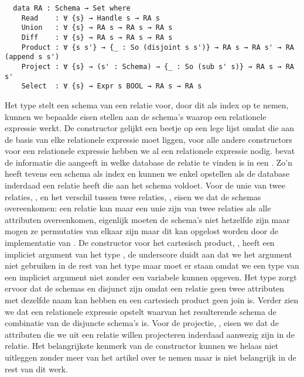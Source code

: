 \begin{verbatim}
  data RA : Schema → Set where
    Read    : ∀ {s} → Handle s → RA s
    Union   : ∀ {s} → RA s → RA s → RA s
    Diff    : ∀ {s} → RA s → RA s → RA s
    Product : ∀ {s s'} → {_ : So (disjoint s s')} → RA s → RA s' → RA (append s s')
    Project : ∀ {s} → (s' : Schema) → {_ : So (sub s' s)} → RA s → RA s'
    Select  : ∀ {s} → Expr s BOOL → RA s → RA s
\end{verbatim}

Het type  stelt een schema van een relatie voor, door dit als
index op te nemen, kunnen we bepaalde eisen stellen aan de schema's waarop een
relationele expressie werkt. De  constructor gelijkt een beetje op
een lege lijst omdat die aan de basis van elke relationele expressie moet
liggen, voor alle andere constructors voor een relationele expressie hebben we
al een relationele expressie nodig.  bevat de informatie die
aangeeft in welke database de relatie te vinden is in een . Zo'n
 heeft tevens een schema als index en kunnen we enkel opstellen
als de database inderdaad een relatie heeft die aan het schema voldoet. Voor de
unie van twee relaties, , en het verschil tussen twee relaties,
, eisen we dat de schemas overeenkomen: een relatie kan maar een
unie zijn van twee relaties als alle attributen overeenkomen, eigenlijk moeten
de schema's niet hetzelfde zijn maar mogen ze permutaties van elkaar zijn maar
dit kan opgelost worden door de implementatie van . De
constructor voor het cartesisch product, , heeft een impliciet
argument van het type , de underscore duidt aan dat
we het argument niet gebruiken in de rest van het type maar moet er staan omdat
we een type van een impliciet argument niet zonder een variabele kunnen
opgeven. Het type  zorgt ervoor dat de schemas
 en  disjunct zijn omdat een relatie geen twee attributen
met dezelfde naam kan hebben en een cartesisch product geen join is. Verder
zien we dat  een relationele expressie opstelt waarvan het
resulterende schema de combinatie van de disjuncte schema's is. Voor de
projectie, , eisen we dat de attributen die we uit een relatie
willen projecteren inderdaad aanwezig zijn in de relatie. Het belangrijkste
kenmerk van de  constructor kunnen we helaas niet uitleggen
zonder meer van het artikel over te nemen maar is niet belangrijk in de rest
van dit werk.

